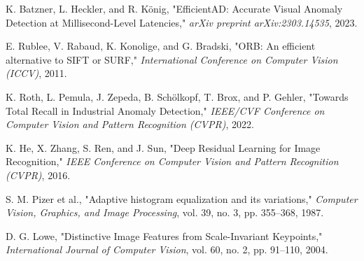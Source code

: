 \documentclass[11pt,a4paper,draft]{article}
\begin{document}
\begin{enumerate}[label={[\arabic*]}, leftmargin=*]
    \item K. Batzner, L. Heckler, and R. König, "EfficientAD: Accurate Visual Anomaly Detection at Millisecond-Level Latencies," \textit{arXiv preprint arXiv:2303.14535}, 2023.
    
    \item E. Rublee, V. Rabaud, K. Konolige, and G. Bradski, "ORB: An efficient alternative to SIFT or SURF," \textit{International Conference on Computer Vision (ICCV)}, 2011.
    
    \item K. Roth, L. Pemula, J. Zepeda, B. Schölkopf, T. Brox, and P. Gehler, "Towards Total Recall in Industrial Anomaly Detection," \textit{IEEE/CVF Conference on Computer Vision and Pattern Recognition (CVPR)}, 2022.
    
    \item K. He, X. Zhang, S. Ren, and J. Sun, "Deep Residual Learning for Image Recognition," \textit{IEEE Conference on Computer Vision and Pattern Recognition (CVPR)}, 2016.
    
    \item S. M. Pizer et al., "Adaptive histogram equalization and its variations," \textit{Computer Vision, Graphics, and Image Processing}, vol. 39, no. 3, pp. 355–368, 1987.
    
    \item D. G. Lowe, "Distinctive Image Features from Scale-Invariant Keypoints," \textit{International Journal of Computer Vision}, vol. 60, no. 2, pp. 91–110, 2004.
\end{enumerate}
\end{document}
